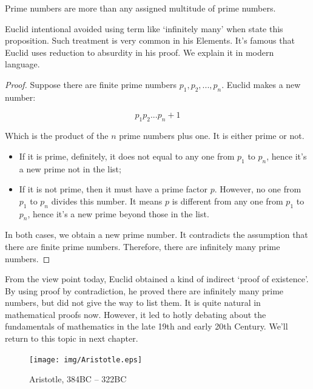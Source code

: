 \documentclass{article}
\begin{document}
\begin{proposition}
Prime numbers are more than any assigned multitude of prime numbers\cite{Elements}.
\end{proposition}

Euclid intentional avoided using term like `infinitely many' when state this proposition. Such treatment is very common in his Elements. It's famous that Euclid uses reduction to absurdity in his proof. We explain it in modern language.

\begin{proof}
Suppose there are finite prime numbers $p_1, p_2, ..., p_n$. Euclid makes a new number:

\[
p_1 p_2 ... p_n + 1
\]

Which is the product of the $n$ prime numbers plus one. It is either prime or not.

\begin{itemize}
\item If it is prime, definitely, it does not equal to any one from $p_1$ to $p_n$, hence it's a new prime not in the list;
\item If it is not prime, then it must have a prime factor $p$. However, no one from $p_1$ to $p_n$ divides this number. It means $p$ is different from any one from $p_1$ to $p_n$, hence it's a new prime beyond those in the list.
\end{itemize}

In both cases, we obtain a new prime number. It contradicts the assumption that there are finite prime numbers. Therefore, there are infinitely many prime numbers.
\end{proof}

From the view point today, Euclid obtained a kind of indirect `proof of existence'. By using proof by contradiction, he proved there are infinitely many prime numbers, but did not give the way to list them. It is quite natural in mathematical proofs now. However, it led to hotly debating about the fundamentals of mathematics in the late 19th and early 20th Century. We'll return to this topic in next chapter.

\begin{figure}[htbp]
 \centering
 \texttt{[image: img/Aristotle.eps]}
 \captionsetup{labelformat=empty}
 \caption{Aristotle, 384BC -- 322BC}
 \label{fig:Aristotle}
\end{figure}
\end{document}
